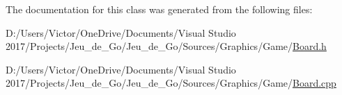 The documentation for this class was generated from the following files\+:\begin{DoxyCompactItemize}
\item 
D\+:/\+Users/\+Victor/\+One\+Drive/\+Documents/\+Visual Studio 2017/\+Projects/\+Jeu\+\_\+de\+\_\+\+Go/\+Jeu\+\_\+de\+\_\+\+Go/\+Sources/\+Graphics/\+Game/\hyperlink{_board_8h}{Board.\+h}\item 
D\+:/\+Users/\+Victor/\+One\+Drive/\+Documents/\+Visual Studio 2017/\+Projects/\+Jeu\+\_\+de\+\_\+\+Go/\+Jeu\+\_\+de\+\_\+\+Go/\+Sources/\+Graphics/\+Game/\hyperlink{_board_8cpp}{Board.\+cpp}\end{DoxyCompactItemize}

